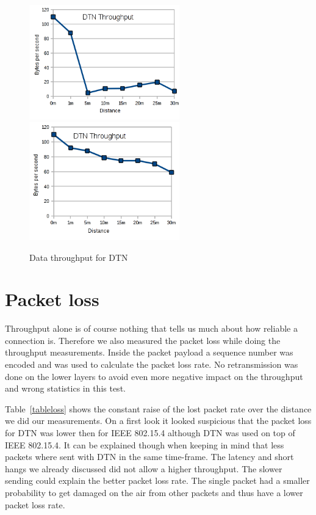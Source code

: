 \begin{figure}
  \begin{center}
    \includegraphics[width=6.5cm]{images/throughput_dtn}
    \includegraphics[width=6.5cm]{images/throughput_dtn2}
    \caption{Data throughput for DTN}
    \label{fig:throughput_dtn}
  \end{center}
\end{figure}

\section{Packet loss}
Throughput alone is of course nothing that tells us much about how reliable a
connection is. Therefore we also measured the packet loss while doing the
throughput measurements. Inside the packet payload a sequence number was encoded
and was used to calculate the packet loss rate. No retransmission
was done on the lower layers to avoid even more negative impact on the
throughput and wrong statistics in this test.

Table~\ref{tableloss} shows the constant raise of the lost packet rate over the
distance we did our measurements. On a first look it looked suspicious that the
packet loss for DTN was lower then for IEEE 802.15.4 although DTN was used on top
of IEEE 802.15.4. It can be explained though when keeping in mind that less
packets where sent with DTN in the same time-frame. The latency and short hangs
we already discussed did not allow a higher throughput. The slower sending could
explain the better packet loss rate. The single packet had a smaller probability
to get damaged on the air from other packets and thus have a lower packet loss
rate.

